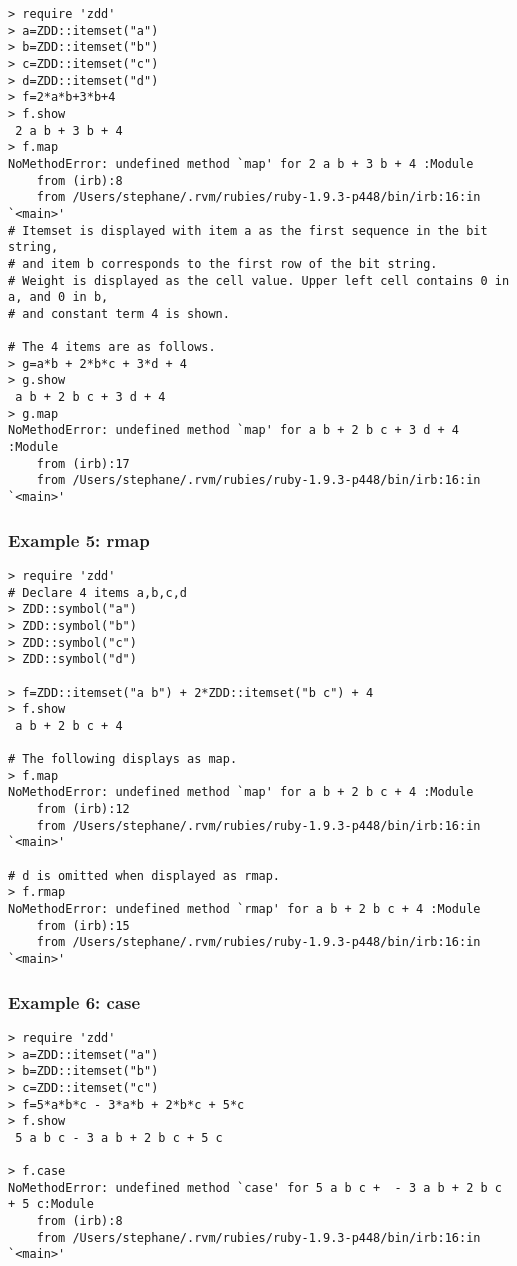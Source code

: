 \begin{Verbatim}[baselinestretch=0.7,frame=single]
> require 'zdd'
> a=ZDD::itemset("a")
> b=ZDD::itemset("b")
> c=ZDD::itemset("c")
> d=ZDD::itemset("d")
> f=2*a*b+3*b+4
> f.show
 2 a b + 3 b + 4
> f.map
NoMethodError: undefined method `map' for 2 a b + 3 b + 4 :Module
	from (irb):8
	from /Users/stephane/.rvm/rubies/ruby-1.9.3-p448/bin/irb:16:in `<main>'
# Itemset is displayed with item a as the first sequence in the bit string,
# and item b corresponds to the first row of the bit string.
# Weight is displayed as the cell value. Upper left cell contains 0 in a, and 0 in b,
# and constant term 4 is shown.

# The 4 items are as follows. 
> g=a*b + 2*b*c + 3*d + 4
> g.show
 a b + 2 b c + 3 d + 4
> g.map
NoMethodError: undefined method `map' for a b + 2 b c + 3 d + 4 :Module
	from (irb):17
	from /Users/stephane/.rvm/rubies/ruby-1.9.3-p448/bin/irb:16:in `<main>'
\end{Verbatim}
\subsubsection*{Example 5: rmap}



\begin{Verbatim}[baselinestretch=0.7,frame=single]
> require 'zdd'
# Declare 4 items a,b,c,d
> ZDD::symbol("a")
> ZDD::symbol("b")
> ZDD::symbol("c")
> ZDD::symbol("d")

> f=ZDD::itemset("a b") + 2*ZDD::itemset("b c") + 4
> f.show
 a b + 2 b c + 4

# The following displays as map.
> f.map
NoMethodError: undefined method `map' for a b + 2 b c + 4 :Module
	from (irb):12
	from /Users/stephane/.rvm/rubies/ruby-1.9.3-p448/bin/irb:16:in `<main>'

# d is omitted when displayed as rmap. 
> f.rmap
NoMethodError: undefined method `rmap' for a b + 2 b c + 4 :Module
	from (irb):15
	from /Users/stephane/.rvm/rubies/ruby-1.9.3-p448/bin/irb:16:in `<main>'
\end{Verbatim}
\subsubsection*{Example 6: case}



\begin{Verbatim}[baselinestretch=0.7,frame=single]
> require 'zdd'
> a=ZDD::itemset("a")
> b=ZDD::itemset("b")
> c=ZDD::itemset("c")
> f=5*a*b*c - 3*a*b + 2*b*c + 5*c
> f.show
 5 a b c - 3 a b + 2 b c + 5 c

> f.case
NoMethodError: undefined method `case' for 5 a b c +  - 3 a b + 2 b c + 5 c:Module
	from (irb):8
	from /Users/stephane/.rvm/rubies/ruby-1.9.3-p448/bin/irb:16:in `<main>'
\end{Verbatim}
